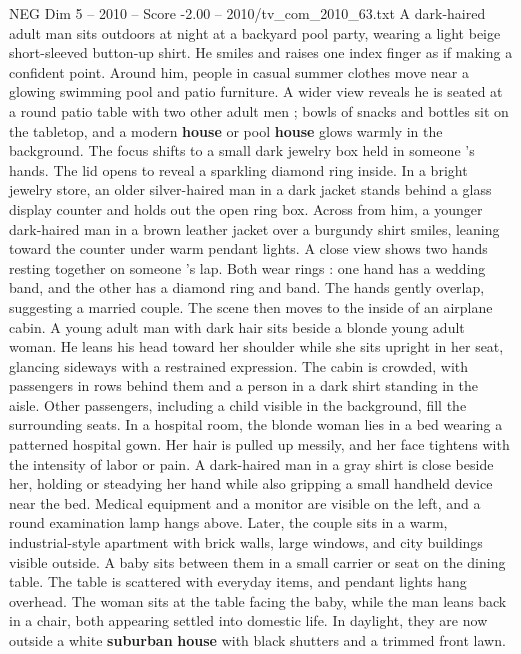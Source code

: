 \begin{textsample}{NEG Dim 5 – 2010 – Score -2.00 – 2010/tv\_com\_2010\_63.txt}  \label{ex:f5_neg_059}
A dark-haired adult man sits outdoors at night at a backyard pool party, wearing a light beige short-sleeved button-up shirt.
He smiles and raises one index finger as if making a confident point.
Around him, people in casual summer clothes move near a glowing swimming pool and patio furniture.
A wider view reveals he is seated at a round patio table with two other adult men ; bowls of snacks and bottles sit on the tabletop, and a modern \textbf{house} or pool \textbf{house} glows warmly in the background.
The focus shifts to a small dark jewelry box held in someone ’s hands.
The lid opens to reveal a sparkling diamond ring inside.
In a bright jewelry store, an older silver-haired man in a dark jacket stands behind a glass display counter and holds out the open ring box.
Across from him, a younger dark-haired man in a brown leather jacket over a burgundy shirt smiles, leaning toward the counter under warm pendant lights.
A close view shows two hands resting together on someone ’s lap.
Both wear rings : one hand has a wedding band, and the other has a diamond ring and band.
The hands gently overlap, suggesting a married couple.
The scene then moves to the inside of an airplane cabin.
A young adult man with dark hair sits beside a blonde young adult woman.
He leans his head toward her shoulder while she sits upright in her seat, glancing sideways with a restrained expression.
The cabin is crowded, with passengers in rows behind them and a person in a dark shirt standing in the aisle.
Other passengers, including a child visible in the background, fill the surrounding seats.
In a hospital room, the blonde woman lies in a bed wearing a patterned hospital gown.
Her hair is pulled up messily, and her face tightens with the intensity of labor or pain.
A dark-haired man in a gray shirt is close beside her, holding or steadying her hand while also gripping a small handheld device near the bed.
Medical equipment and a monitor are visible on the left, and a round examination lamp hangs above.
Later, the couple sits in a warm, industrial-style apartment with brick walls, large windows, and city buildings visible outside.
A baby sits between them in a small carrier or seat on the dining table.
The table is scattered with everyday items, and pendant lights hang overhead.
The woman sits at the table facing the baby, while the man leans back in a chair, both appearing settled into domestic life.
In daylight, they are now outside a white \textbf{suburban} \textbf{house} with black shutters and a trimmed front lawn.

\end{textsample}
